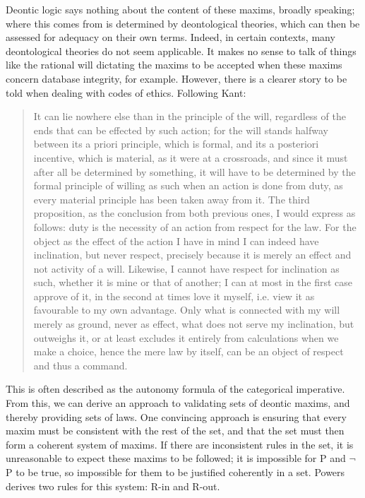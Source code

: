 \documentclass{l4proj}
\begin{document}
Deontic logic says nothing about the content of these maxims, broadly speaking; where this comes from is determined by deontological theories, which can then be assessed for adequacy on their own terms. Indeed, in certain contexts, many deontological theories do not seem applicable. It makes no sense to talk of things like the rational will dictating the maxims to be accepted when these maxims concern database integrity, for example. However, there is a clearer story to be told when dealing with codes of ethics. Following Kant\cite{groundwork}: 

\blockquote{It can lie nowhere else than in the principle of the will, regardless of the ends that can be effected by such action; for the will stands halfway between its a priori principle, which is formal, and its a posteriori incentive, which is material, as it were at a crossroads, and since it must after all be determined by something, it will have to be determined by the formal principle of willing as such when an action is done from duty, as every material principle has been taken away from it. The third proposition, as the conclusion from both previous ones, I would express as follows: duty is the necessity of an action from respect for the law. For the object as the effect of the action I have in mind I can indeed have inclination, but never respect, precisely because it is merely an effect and not activity of a will. Likewise, I cannot have respect for inclination as such, whether it is mine or that of another; I can at most in the first case approve of it, in the second at times love it myself, i.e. view it as favourable to my own advantage. Only what is connected with my will merely as ground, never as effect, what does not serve my inclination, but outweighs it, or at least excludes it entirely from calculations when we make a choice, hence the mere law by itself, can be an object of respect and thus a command.}

This is often described as the autonomy formula of the categorical imperative. From this, we can derive an approach to validating sets of deontic maxims, and thereby providing sets of laws. One convincing approach is ensuring that every maxim must be consistent with the rest of the set, and that the set must then form a coherent system of maxims\cite{Powers}. If there are inconsistent rules in the set, it is unreasonable to expect these maxims to be followed; it is impossible for P and \( \neg \) P to be true, so impossible for them to be justified coherently in a set. Powers derives two rules for this system: R-in and R-out. 
\end{document}
